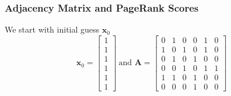 \begin{center}
\end{center}

\subsubsection*{Adjacency Matrix and PageRank Scores}

We start with initial guess $\textbf{x}_0$
\[\textbf{x}_0=\begin{bmatrix}
    1\\1\\1\\1\\1\\1
\end{bmatrix}\ \text{and }  \textbf{A} = \begin{bmatrix}
0 & 1 & 0 & 0 & 1 & 0 \\
1 & 0 & 1 & 0 & 1 & 0 \\
0 & 1 & 0 & 1 & 0 & 0 \\
0 & 0 & 1 & 0 & 1 & 1 \\
1 & 1 & 0 & 1 & 0 & 0 \\
0 & 0 & 0 & 1 & 0 & 0
\end{bmatrix}\]

